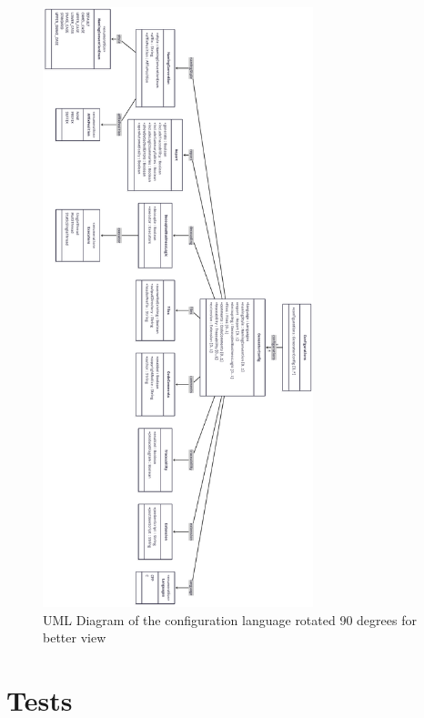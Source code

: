 \begin{figure}[htbp]
\centering
\includegraphics[width=0.7\textwidth]{configLanguageUMLRotated.png}
\caption{UML Diagram of the configuration language rotated 90 degrees for better view}
\label{figapp:configLanguageUMLRotated}
\end{figure}


\newpage

\section{Tests}
\label{app:unit_tests}


